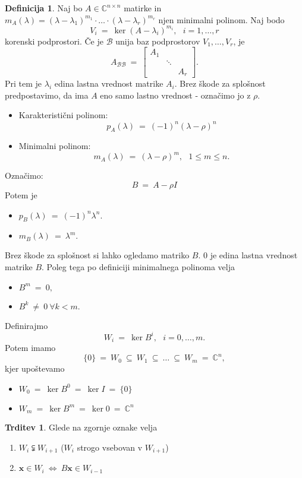 \documentclass[11pt]{article}
\newcommand{\x}{\mathbf{x}}
\newcommand{\0}{\mathbf{0}}
\newcommand{\B}{\mathscr{B}}
\theoremstyle{definition}
\newtheorem{definicija}{Definicija}[section]
\theoremstyle{definition}
\newtheorem{trditev}{Trditev}[section]
\theoremstyle{definition}
\theoremstyle{definition}
\begin{document}
\begin{definicija}

Naj bo $A \in \mathbb{C}^{n \times n}$ matirke in $m_A(\lambda) = (\lambda-\lambda_1)^{m_1}\cdot\ldots\cdot(\lambda-\lambda_r)^{m_r}$ njen minimalni polinom. Naj bodo
$$V_i ~=~ \ker(A-\lambda_i)^{m_i}, ~~~i=1,\ldots,r$$
korenski podprostori. Če je $\B$ unija baz podprostorov $V_1,\ldots,V_r$, je
$$A_{\B\B} ~=~ \begin{bmatrix}
A_1 & ~ & ~ \\
~ & \ddots & ~ \\
~ & ~ & A_r
\end{bmatrix}.$$
Pri tem je $\lambda_i$ edina lastna vrednost matrike $A_i$. Brez škode za splošnost predpostavimo, da ima $A$ eno samo lastno vrednost - označimo jo z $\rho$.
\begin{itemize}
	\item Karakteristični polinom: 
	$$p_A(\lambda) ~=~ (-1)^n (\lambda - \rho)^n$$
	\item Minimalni polinom: 
	$$m_A(\lambda) ~=~ (\lambda - \rho)^m, ~~~1 \leq m \leq n.$$
\end{itemize}
Označimo:
$$B ~=~ A - \rho I$$
Potem je
\begin{itemize}
	\item $p_B(\lambda) ~=~ (-1)^n\lambda^n.$ 
	\item $m_B(\lambda) ~=~ \lambda^m.$
\end{itemize}
Brez škode za splošnost si lahko ogledamo matriko $B$. $0$ je edina lastna vrednost matrike $B$. Poleg tega po definiciji minimalnega polinoma velja
\begin{itemize}
	\item $B^m ~=~ 0,$
	\item $B^k ~\neq~ 0 ~\forall k<m.$
\end{itemize}
Definirajmo
$$W_i ~=~ \ker B^i, ~~~i=0,\ldots,m.$$
Potem imamo
$$\{0\} ~=~ W_0 ~\subseteq~ W_1 ~\subseteq~ \ldots ~\subseteq~ W_m ~=~ \mathbb{C}^n,$$
kjer upoštevamo
\begin{itemize}
	\item $W_0 ~=~ \ker B^0 ~=~ \ker I ~=~ \{0\}$ 
	\item $W_m ~=~ \ker B^m ~=~ \ker 0 ~=~ \mathbb{C}^n$
\end{itemize}

\end{definicija}
\vspace{0.5cm}

\begin{trditev}

Glede na zgornje oznake velja
\begin{enumerate}
	\item $W_i \subsetneqq W_{i+1}$ ($W_i$ strogo vsebovan v $W_{i+1}$)
	\item $\x \in W_i ~\iff~ B\x \in W_{i-1}$ 
\end{enumerate}

\end{trditev}
\vspace{0.5cm}
\end{document}
